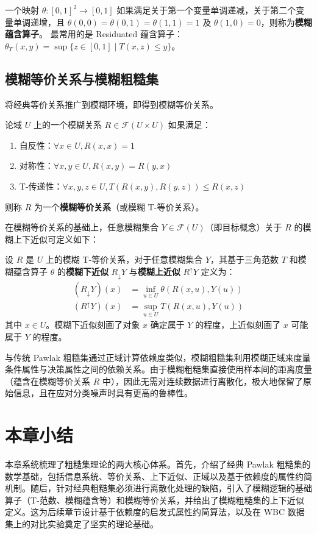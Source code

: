 \begin{definition}[模糊蕴含算子]
	一个映射 \(\theta: [0,1]^2 \to [0,1]\) 如果满足关于第一个变量单调递减，关于第二个变量单调递增，且 \(\theta(0,0)=\theta(0,1)=\theta(1,1)=1\) 及 \(\theta(1,0)=0\)，则称为\textbf{模糊蕴含算子}。
	最常用的是 Residuated 蕴含算子：\(\theta_T(x,y) = \sup\{z \in [0,1] \mid T(x,z) \le y\}\)。
\end{definition}

\subsection{模糊等价关系与模糊粗糙集}

将经典等价关系推广到模糊环境，即得到模糊等价关系。

\begin{definition}[模糊等价关系]
	论域 \(U\) 上的一个模糊关系 \(R \in \mathcal{F}(U \times U)\) 如果满足：
	\begin{enumerate}
		\item 自反性：\(\forall x \in U, R(x,x) = 1\)
		\item 对称性：\(\forall x, y \in U, R(x,y) = R(y,x)\)
		\item T-传递性：\(\forall x, y, z \in U, T(R(x,y), R(y,z)) \le R(x,z)\)
	\end{enumerate}
	则称 \(R\) 为一个\textbf{模糊等价关系}（或模糊 T-等价关系）。
\end{definition}

在模糊等价关系的基础上，任意模糊集合 \(Y \in \mathcal{F}(U)\)（即目标概念）关于 \(R\) 的模糊上下近似可定义如下：

\begin{definition}[模糊上下近似]
	设 \(R\) 是 \(U\) 上的模糊 T-等价关系，对于任意模糊集合 \(Y\)，其基于三角范数 \(T\) 和模糊蕴含算子 \(\theta\) 的\textbf{模糊下近似} \(R_{\downarrow}Y\) 与\textbf{模糊上近似} \(R^{\uparrow}Y\) 定义为：
	\begin{align}
		(R_{\downarrow}Y)(x) &= \inf_{u \in U} \theta(R(x,u), Y(u)) \\
		(R^{\uparrow}Y)(x) &= \sup_{u \in U} T(R(x,u), Y(u))
	\end{align}
	其中 \(x \in U\)。模糊下近似刻画了对象 \(x\) 确定属于 \(Y\) 的程度，上近似刻画了 \(x\) 可能属于 \(Y\) 的程度。
\end{definition}

与传统 Pawlak 粗糙集通过正域计算依赖度类似，模糊粗糙集利用模糊正域来度量条件属性与决策属性之间的依赖关系。由于模糊粗糙集直接使用样本间的距离度量（蕴含在模糊等价关系 \(R\) 中），因此无需对连续数据进行离散化，极大地保留了原始信息，且在应对分类噪声时具有更高的鲁棒性。

\section{本章小结}

本章系统梳理了粗糙集理论的两大核心体系。首先，介绍了经典 Pawlak 粗糙集的数学基础，包括信息系统、等价关系、上下近似、正域以及基于依赖度的属性约简机制。随后，针对经典粗糙集必须进行离散化处理的缺陷，引入了模糊逻辑的基础算子（T-范数、模糊蕴含等）和模糊等价关系，并给出了模糊粗糙集的上下近似定义。这为后续章节设计基于依赖度的启发式属性约简算法，以及在 WBC 数据集上的对比实验奠定了坚实的理论基础。